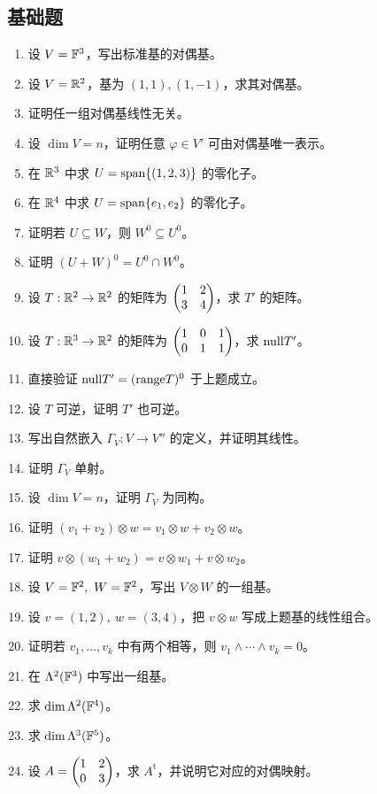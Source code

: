 \subsection*{基础题}




\begin{enumerate}[label=\textbf{\arabic*.}, leftmargin=*, itemsep=0.5em] \item \basic 设 $V=\mathbb{F}^3$，写出标准基的对偶基。 \item \basic 设 $V=\mathbb{R}^2$，基为 $(1,1),(1,-1)$，求其对偶基。 \item \basic 证明任一组对偶基线性无关。 \item \basic 设 $\dim V=n$，证明任意 $\varphi\in V'$ 可由对偶基唯一表示。 \item \basic 在 $\mathbb{R}^3$ 中求 $U=\operatorname{span}\{(1,2,3)\}$ 的零化子。 \item \basic 在 $\mathbb{R}^4$ 中求 $U=\operatorname{span}\{e_1,e_2\}$ 的零化子。 \item \basic 证明若 $U\subseteq W$，则 $W^0\subseteq U^0$。 \item \basic 证明 $(U+W)^0=U^0\cap W^0$。 \item \basic 设 $T:\mathbb{R}^2\to\mathbb{R}^2$ 的矩阵为 $\begin{pmatrix} 1&2\\3&4 \end{pmatrix}$，求 $T'$ 的矩阵。 \item \basic 设 $T:\mathbb{R}^3\to\mathbb{R}^2$ 的矩阵为 $\begin{pmatrix} 1&0&1\\0&1&1 \end{pmatrix}$，求 $\mathrm{null} T'$。 \item \basic 直接验证 $\mathrm{null} T'=(\mathrm{range} T)^0$ 于上题成立。 \item \basic 设 $T$ 可逆，证明 $T'$ 也可逆。 \item \basic 写出自然嵌入 $\Gamma_V:V\to V''$ 的定义，并证明其线性。 \item \basic 证明 $\Gamma_V$ 单射。 \item \basic 设 $\dim V=n$，证明 $\Gamma_V$ 为同构。 \item \basic 证明 $(v_1+v_2)\otimes w=v_1\otimes w+v_2\otimes w$。 \item \basic 证明 $v\otimes(w_1+w_2)=v\otimes w_1+v\otimes w_2$。 \item \basic 设 $V=\mathbb{F}^2,\ W=\mathbb{F}^2$，写出 $V\otimes W$ 的一组基。 \item \basic 设 $v=(1,2),\ w=(3,4)$，把 $v\otimes w$ 写成上题基的线性组合。 \item \basic 证明若 $v_1,\dots,v_k$ 中有两个相等，则 $v_1\wedge\cdots\wedge v_k=0$。 \item \basic 在 $\Lambda^2(\mathbb{F}^3)$ 中写出一组基。 \item \basic 求 $\dim\Lambda^2(\mathbb{F}^4)$。 \item \basic 求 $\dim\Lambda^3(\mathbb{F}^5)$。 \item \basic 设 $A=\begin{pmatrix} 1&2\\0&3 \end{pmatrix}$，求 $A^{\mathrm t}$，并说明它对应的对偶映射。 \end{enumerate}




